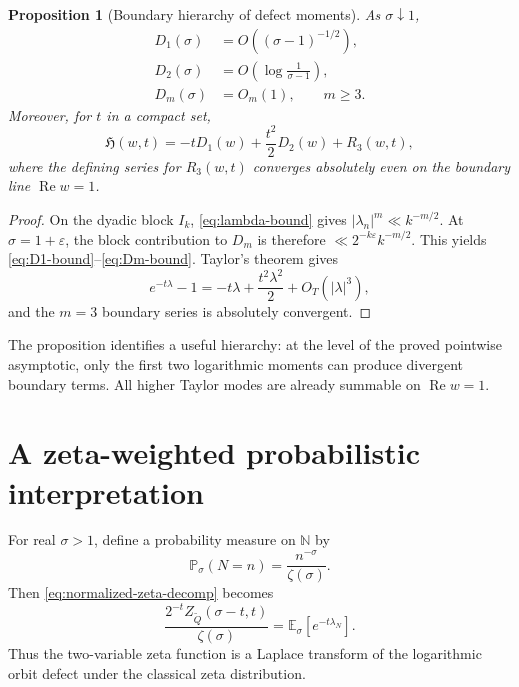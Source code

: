 \documentclass[11pt]{article}
\newtheorem{proposition}[theorem]{Proposition}
\theoremstyle{definition}
\theoremstyle{remark}
\newcommand{\Qp}{\widetilde Q}
\newcommand{\N}{\mathbb N}
\newcommand{\RePart}{\operatorname{Re}}
\newcommand{\Hz}{\mathfrak H}
\newcommand{\eps}{\varepsilon}
\begin{document}
\begin{proposition}[Boundary hierarchy of defect moments]
\label{prop:moment-hierarchy}
As \(\sigma\downarrow1\),
\begin{align}
D_1(\sigma)&=O\!\left((\sigma-1)^{-1/2}\right),
\label{eq:D1-bound}\\
D_2(\sigma)&=O\!\left(\log\frac1{\sigma-1}\right),
\label{eq:D2-bound}\\
D_m(\sigma)&=O_m(1),\qquad m\ge3.
\label{eq:Dm-bound}
\end{align}
Moreover, for \(t\) in a compact set,
\begin{equation}
\Hz(w,t)
=-tD_1(w)+\frac{t^2}{2}D_2(w)+R_3(w,t),
\label{eq:second-order-H}
\end{equation}
where the defining series for \(R_3(w,t)\) converges absolutely even on the boundary line \(\RePart w=1\).
\end{proposition}

\begin{proof}
On the dyadic block \(I_k\), \eqref{eq:lambda-bound} gives \(|\lambda_n|^m\ll k^{-m/2}\).  At \(\sigma=1+\eps\), the block contribution to \(D_m\) is therefore \(\ll2^{-k\eps}k^{-m/2}\).  This yields \eqref{eq:D1-bound}--\eqref{eq:Dm-bound}.  Taylor's theorem gives
\[
e^{-t\lambda}-1
=-t\lambda+\frac{t^2\lambda^2}{2}+O_T(|\lambda|^3),
\]
and the \(m=3\) boundary series is absolutely convergent.
\end{proof}

The proposition identifies a useful hierarchy: at the level of the proved pointwise asymptotic, only the first two logarithmic moments can produce divergent boundary terms.  All higher Taylor modes are already summable on \(\RePart w=1\).

\section{A zeta-weighted probabilistic interpretation}

For real \(\sigma>1\), define a probability measure on \(\N\) by
\begin{equation}
\mathbb P_\sigma(N=n)=\frac{n^{-\sigma}}{\zeta(\sigma)}.
\label{eq:zeta-measure}
\end{equation}
Then \eqref{eq:normalized-zeta-decomp} becomes
\begin{equation}
{
\frac{2^{-t}Z_{\Qp}(\sigma-t,t)}{\zeta(\sigma)}
=\mathbb E_\sigma\!\left[e^{-t\lambda_N}\right].
}
\label{eq:laplace-expectation}
\end{equation}
Thus the two-variable zeta function is a Laplace transform of the logarithmic orbit defect under the classical zeta distribution.
\end{document}

